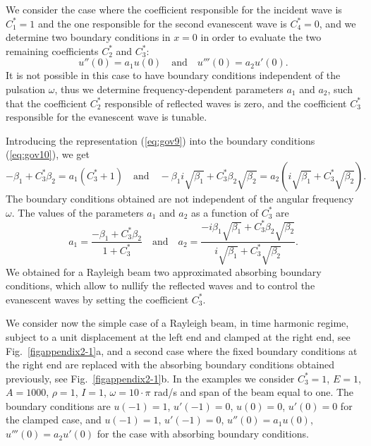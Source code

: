 \documentclass[11pt]{article}
\begin{document}
We consider the case where the coefficient responsible for the incident wave is $C_1^*=1$ and the one responsible for the second evanescent wave is $C_4^*=0$, and we determine two boundary conditions in $x=0$ in order to evaluate the two remaining coefficients $C_2^*$ and $C_3^*$:
%
\begin{equation}
\label{eq:gov10}
u''(0)=a_1 u(0) \quad \textrm{and} \quad u'''(0)=a_2 u'(0).
\end{equation}
%
It is not possible in this case to have boundary conditions independent of the pulsation $\omega$, thus we determine frequency-dependent parameters $a_1$ and $a_2$, such that the coefficient $C_2^*$ responsible of reflected waves is zero, and the coefficient $C_3^*$ responsible for the evanescent wave is tunable.

Introducing the representation (\ref{eq:gov9}) into the boundary conditions (\ref{eq:gov10}), we get
%
\begin{equation}
\label{eq:gov11}
-\beta_1+C_3^*\beta_2=a_1(C_3^*+1) \quad \textrm{and} \quad -\beta_1 i\sqrt{\beta_1}+C_3^*\beta_2\sqrt{\beta_2}=a_2(i\sqrt{\beta_1}+C_3^*\sqrt{\beta_2}).
\end{equation}
%
The boundary conditions obtained are not independent of the angular frequency $\omega$. The values of the parameters $a_1$ and $a_2$ as a function of $C_3^*$ are
%
\begin{equation}
\label{eq:gov12}
a_1=\frac{-\beta_1+C_3^*\beta_2}{1+C_3^*} \quad \textrm{and} \quad
a_2= \frac{-i\beta_1\sqrt{\beta_1}+C_3^*\beta_2\sqrt{\beta_2}}{i\sqrt{\beta_1}+C_3^*\sqrt{\beta_2}}.
\end{equation}
%
We obtained for a Rayleigh beam two approximated absorbing boundary conditions, which allow to nullify the reflected waves and to control the evanescent waves by setting the coefficient $C_3^*$.

We consider now the simple case of a Rayleigh beam, in time harmonic regime, subject to a unit displacement at the left end and clamped at the right end, see Fig.~\ref{figappendix2-1}a, and a second case where the fixed boundary conditions at the right end are replaced with the absorbing boundary conditions obtained previously, see Fig.~\ref{figappendix2-1}b. In the examples we consider $C_3^*=1$, $E=1$, $A=1000$, $\rho=1$, $I=1$, $\omega=10\!\cdot\!\pi$ rad/s and span of the beam equal to one. The boundary conditions are $u(-1)=1$, $u'(-1)=0$, $u(0)=0$, $u'(0)=0$ for the clamped case, and $u(-1)=1$, $u'(-1)=0$, $u''(0)=a_1 u(0)$, $u'''(0)=a_2 u'(0)$ for the case with absorbing boundary conditions.
\end{document}
